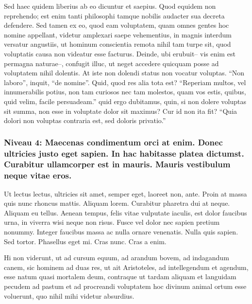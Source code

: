 \documentclass[twoside]{extreport}
\begin{document}
Sed haec quidem liberius ab eo dicuntur et saepius. Quod equidem non
reprehendo; est enim tanti philosophi tamque nobilis audacter sua
decreta defendere. Sed tamen ex eo, quod eam voluptatem, quam omnes
gentes hoc nomine appellant, videtur amplexari saepe vehementius, in
magnis interdum versatur angustiis, ut hominum conscientia remota nihil
tam turpe sit, quod voluptatis causa non videatur esse facturus. Deinde,
ubi erubuit-- vis enim est permagna naturae--, confugit illuc, ut neget
accedere quicquam posse ad voluptatem nihil dolentis. At iste non
dolendi status non vocatur voluptas. ``Non laboro'', inquit, ``de
nomine''. Quid, quod res alia tota est? ``Reperiam multos, vel
innumerabilis potius, non tam curiosos nec tam molestos, quam vos estis,
quibus, quid velim, facile persuadeam.'' quid ergo dubitamus, quin, si
non dolere voluptas sit summa, non esse in voluptate dolor sit maximus?
Cur id non ita fit? ``Quia dolori non voluptas contraria est, sed
doloris privatio.''

\hypertarget{niveau-4-maecenas-condimentum-orci-at-enim.-donec-ultricies-justo-eget-sapien.-in-hac-habitasse-platea-dictumst.-curabitur-ullamcorper-est-in-mauris.-mauris-vestibulum-neque-vitae-eros.}{%
\subsubsection{Niveau 4: Maecenas condimentum orci at enim. Donec
ultricies justo eget sapien. In hac habitasse platea dictumst. Curabitur
ullamcorper est in mauris. Mauris vestibulum neque vitae
eros.}\label{niveau-4-maecenas-condimentum-orci-at-enim.-donec-ultricies-justo-eget-sapien.-in-hac-habitasse-platea-dictumst.-curabitur-ullamcorper-est-in-mauris.-mauris-vestibulum-neque-vitae-eros.}}

Ut lectus lectus, ultricies sit amet, semper eget, laoreet non, ante.
Proin at massa quis nunc rhoncus mattis. Aliquam lorem. Curabitur
pharetra dui at neque. Aliquam eu tellus. Aenean tempus, felis vitae
vulputate iaculis, est dolor faucibus urna, in viverra wisi neque non
risus. Fusce vel dolor nec sapien pretium nonummy. Integer faucibus
massa ac nulla ornare venenatis. Nulla quis sapien. Sed tortor.
Phasellus eget mi. Cras nunc. Cras a enim.

Hi non viderunt, ut ad cursum equum, ad arandum bovem, ad indagandum
canem, sic hominem ad duas res, ut ait Aristoteles, ad intellegendum et
agendum, esse natum quasi mortalem deum, contraque ut tardam aliquam et
languidam pecudem ad pastum et ad procreandi voluptatem hoc divinum
animal ortum esse voluerunt, quo nihil mihi videtur absurdius.
\end{document}
